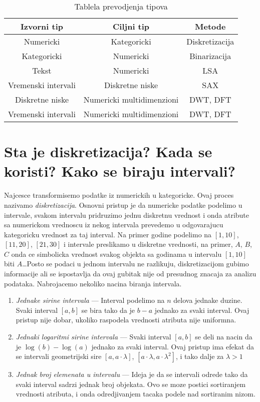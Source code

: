 \documentclass[a4paper]{article}
\begin{document}
\begin{table}[H]
    \centering
    \caption{Tablela prevodjenja tipova}
    \begin{tabular}{||c|c|c||}
        \hline
        \textbf{Izvorni tip} & \textbf{Ciljni tip} & \textbf{Metode} \\ \hline \hline
        Numericki & Kategoricki & Diskretizacija \\ \hline
        Kategoricki & Numericki & Binarizacija \\ \hline 
        Tekst & Numericki & LSA \\ \hline
        Vremenski intervali & Diskretne niske & SAX \\ \hline
        Diskretne niske & Numericki multidimenzioni & DWT, DFT \\ \hline
        Vremenski intervali & Numericki multidimenzioni & DWT, DFT \\ \hline \hline
    \end{tabular}
\end{table} 

\section{Sta je diskretizacija? Kada se koristi? Kako se biraju intervali?}
\label{sect_diskretizacija}
Najcesce transformisemo podatke iz numerickih u kategoricke. Ovaj proces nazivamo
\emph{diskretizacija}. Osnovni pristup je da numericke podatke podelimo u intervale, svakom
intervalu pridruzimo jednu diskretnu vrednost i onda atribute sa numerickom vrednoscu iz nekog
intervala prevedemo u odgovarajucu kategoricku vrednost za taj interval. Na primer godine podelimo
na \([1, 10]\), \([11, 20]\), \([21, 30]\) i intervale preslikamo u diskretne vrednosti, na primer,
\(A\), \(B\), \(C\) onda ce simbolicka vrednost svakog objekta sa godinama u intervalu \([1, 10]\)
biti \(A\)\ldots Posto se podaci u jednom intervalu ne razlikuju, diskretizacijom gubimo informacije
ali se ispostavlja da ovaj gubitak nije od presudnog znacaja za analizu podataka. Nabrojacemo
nekoliko nacina biranja intervala.
\begin{enumerate}
    \item \emph{Jednake sirine intervala} --- Interval podelimo na \(n\) delova jednake duzine.
        Svaki interval \([a, b]\) se bira tako da je \(b - a\) jednako za svaki interval. Ovaj
        pristup nije dobar, ukoliko raspodela vrednosti atributa nije uniformna.
    \item \emph{Jednaki logaritmi sirine intervala} --- Svaki interval \([a, b]\) se deli na nacin
        da je \(\log(b) - \log(a)\) jednako za svaki interval. Ovaj pristup ima efekat da se
        intervali geometrijski sire \([a, a \cdot \lambda]\),
        \([a\cdot \lambda, a \cdot \lambda^2]\), i tako dalje za \(\lambda > 1\)
    \item \label{podela_intervala:jednak_br_el} \emph{Jednak broj elemenata u intervalu} --- Ideja
        je da se intervali odrede tako da svaki interval sadrzi jednak broj objekata. Ovo se moze
        postici sortiranjem vrednosti atributa, i onda odredjivanjem tacaka podele nad sortiranim
        nizom.
\end{enumerate}
\end{document}

